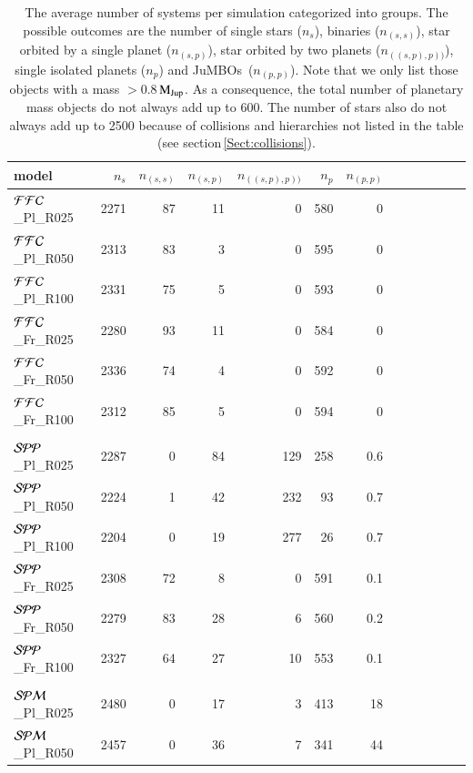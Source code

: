 \documentclass[submission,phys]{lib/SciPost}
\newcommand{\MJup}{\mbox{$\mathrm{{M}}_{\rm Jup}$}}
\newcommand{\jumbos}{\mbox{JuMBOs}}
\begin{document}
\begin{table}
  \caption{The average number of systems per simulation
    categorized into groups.  The possible outcomes are the number of
    single stars ($n_{s}$), binaries ($n_{(s,s)}$), star orbited by a
    single planet ($n_{(s,p)}$), star orbited by two planets
    ($n_{((s,p),p))}$), single isolated planets ($n_{p}$) and
    \jumbos\, ($n_{(p,p)}$).  Note that we only list those objects
    with a mass $>0.8$\,\MJup.  As a consequence, the total number of
    planetary mass objects do not always add up to 600.  The number of
    stars also do not always add up to 2500 because of collisions
    and hierarchies not listed in the table (see
    section\,\ref{Sect:collisions}).}
 \label{Tab:model_numbers}
 \centering 
 \begin{tabular}{lrrrrrrrrrrrr}
   \hline\hline
   model & $n_{s}$ & $n_{(s,s)}$ & $n_{(s,p)}$ & $n_{((s,p),p))}$ & $n_{p}$ & $n_{(p,p)}$ \\
  \hline
${\cal FFC}$\_Pl\_R025 &  2271 & 87 & 11 & 0 & 580 & 0 \\
${\cal FFC}$\_Pl\_R050 &  2313 & 83 &  3 & 0 & 595 & 0 \\
${\cal FFC}$\_Pl\_R100 &  2331 & 75 &  5 & 0 & 593 & 0 \\
${\cal FFC}$\_Fr\_R025 &  2280 & 93 & 11 & 0 & 584 & 0 \\
${\cal FFC}$\_Fr\_R050 &  2336 & 74 &  4 & 0 & 592 & 0 \\
${\cal FFC}$\_Fr\_R100 &  2312 & 85 &  5 & 0 & 594 & 0 \\
  \hline
  \hline \vspace{-0.75em}\\
${\cal SPP}$\_Pl\_R025 &  2287 &  0 & 84 & 129 & 258 & 0.6 \\
${\cal SPP}$\_Pl\_R050 &  2224 &  1 & 42 & 232 &  93 & 0.7 \\
${\cal SPP}$\_Pl\_R100 &  2204 &  0 & 19 & 277 &  26 & 0.7 \\
${\cal SPP}$\_Fr\_R025 &  2308 & 72 &  8 &   0 & 591 & 0.1 \\  
${\cal SPP}$\_Fr\_R050 &  2279 & 83 & 28 &   6 & 560 & 0.2 \\ 
${\cal SPP}$\_Fr\_R100 &  2327 & 64 & 27 &  10 & 553 & 0.1 \\
  \hline
  \hline \vspace{-0.75em}\\
${\cal SPM}$\_Pl\_R025 &  2480 &  0 & 17 &  3 & 413 & 18 \\
${\cal SPM}$\_Pl\_R050 &  2457 &  0 & 36 &  7 & 341 & 44 \\

\end{tabular}
\end{table}
\end{document}
